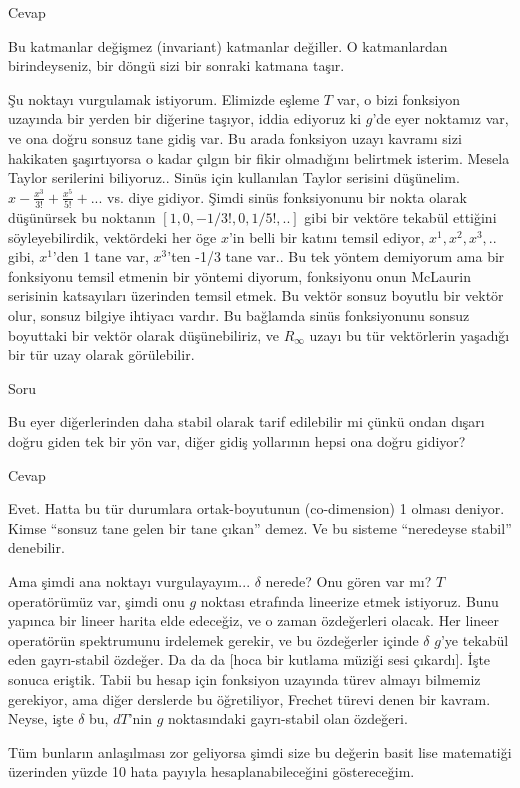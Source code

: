 \documentclass[12pt,fleqn]{article}\usepackage{../../common}
\begin{document}
Cevap

Bu katmanlar değişmez (invariant) katmanlar değiller. O katmanlardan
birindeyseniz, bir döngü sizi bir sonraki katmana taşır. 

Şu noktayı vurgulamak istiyorum. Elimizde eşleme $T$ var, o bizi fonksiyon
uzayında bir yerden bir diğerine taşıyor, iddia ediyoruz ki $g$'de eyer noktamız
var, ve ona doğru sonsuz tane gidiş var. Bu arada fonksiyon uzayı kavramı sizi
hakikaten şaşırtıyorsa o kadar çılgın bir fikir olmadığını belirtmek
isterim. Mesela Taylor serilerini biliyoruz.. Sinüs için kullanılan Taylor
serisini düşünelim. $x-\frac{x^3}{3!}+\frac{x^5}{5!}+...$ vs. diye
gidiyor. Şimdi sinüs fonksiyonunu bir nokta olarak düşünürsek bu noktanın
$[1,0,-1/3!,0,1/5!,..]$ gibi bir vektöre tekabül ettiğini söyleyebilirdik,
vektördeki her öge $x$'in belli bir katını temsil ediyor, $x^1,x^2,x^3,..$ gibi,
$x^1$'den 1 tane var, $x^3$'ten -1/3 tane var.. Bu tek yöntem demiyorum ama bir
fonksiyonu temsil etmenin bir yöntemi diyorum, fonksiyonu onun McLaurin
serisinin katsayıları üzerinden temsil etmek. Bu vektör sonsuz boyutlu bir
vektör olur, sonsuz bilgiye ihtiyacı vardır. Bu bağlamda sinüs fonksiyonunu
sonsuz boyuttaki bir vektör olarak düşünebiliriz, ve $R_\infty$ uzayı bu tür
vektörlerin yaşadığı bir tür uzay olarak görülebilir.

Soru

Bu eyer diğerlerinden daha stabil olarak tarif edilebilir mi çünkü ondan dışarı
doğru giden tek bir yön var, diğer gidiş yollarının hepsi ona doğru gidiyor?

Cevap

Evet. Hatta bu tür durumlara ortak-boyutunun (co-dimension) 1 olması
deniyor. Kimse ``sonsuz tane gelen bir tane çıkan'' demez. Ve bu sisteme
``neredeyse stabil'' denebilir.

Ama şimdi ana noktayı vurgulayayım... $\delta$ nerede? Onu gören var mı? $T$
operatörümüz var, şimdi onu $g$ noktası etrafında lineerize etmek
istiyoruz. Bunu yapınca bir lineer harita elde edeceğiz, ve o zaman özdeğerleri
olacak. Her lineer operatörün spektrumunu irdelemek gerekir, ve bu özdeğerler
içinde $\delta$ $g$'ye tekabül eden gayrı-stabil özdeğer. Da da da [hoca bir
  kutlama müziği sesi çıkardı]. İşte sonuca eriştik. Tabii bu hesap için
fonksiyon uzayında türev almayı bilmemiz gerekiyor, ama diğer derslerde bu
öğretiliyor, Frechet türevi denen bir kavram. Neyse, işte $\delta$ bu, $dT$'nin
$g$ noktasındaki gayrı-stabil olan özdeğeri.

Tüm bunların anlaşılması zor geliyorsa şimdi size bu değerin basit lise
matematiği üzerinden yüzde 10 hata payıyla hesaplanabileceğini
göstereceğim.
\end{document}
